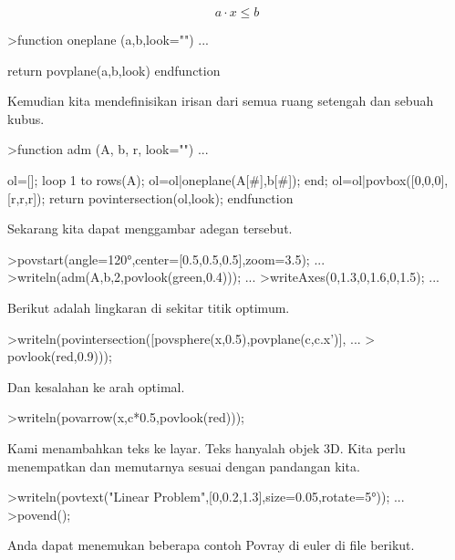 \documentclass{article}
\begin{document}
\begin{eulernotebook}
\begin{eulercomment}
\end{eulercomment}
\begin{eulerformula}
\[
a \cdot x \le b
\]
\end{eulerformula}
\begin{eulerprompt}
>function oneplane (a,b,look="") ...
\end{eulerprompt}
\begin{eulerudf}
    return povplane(a,b,look)
  endfunction
\end{eulerudf}
\begin{eulercomment}
Kemudian kita mendefinisikan irisan dari semua ruang setengah dan
sebuah kubus.
\end{eulercomment}
\begin{eulerprompt}
>function adm (A, b, r, look="") ...
\end{eulerprompt}
\begin{eulerudf}
    ol=[];
    loop 1 to rows(A); ol=ol|oneplane(A[#],b[#]); end;
    ol=ol|povbox([0,0,0],[r,r,r]);
    return povintersection(ol,look);
  endfunction
\end{eulerudf}
\begin{eulercomment}
Sekarang kita dapat menggambar adegan tersebut.
\end{eulercomment}
\begin{eulerprompt}
>povstart(angle=120°,center=[0.5,0.5,0.5],zoom=3.5); ...
>writeln(adm(A,b,2,povlook(green,0.4))); ...
>writeAxes(0,1.3,0,1.6,0,1.5); ...
\end{eulerprompt}
\begin{eulercomment}
Berikut adalah lingkaran di sekitar titik optimum.
\end{eulercomment}
\begin{eulerprompt}
>writeln(povintersection([povsphere(x,0.5),povplane(c,c.x')], ...
>  povlook(red,0.9)));
\end{eulerprompt}
\begin{eulercomment}
Dan kesalahan ke arah optimal.
\end{eulercomment}
\begin{eulerprompt}
>writeln(povarrow(x,c*0.5,povlook(red)));
\end{eulerprompt}
\begin{eulercomment}
Kami menambahkan teks ke layar. Teks hanyalah objek 3D. Kita perlu
menempatkan dan memutarnya sesuai dengan pandangan kita.
\end{eulercomment}
\begin{eulerprompt}
>writeln(povtext("Linear Problem",[0,0.2,1.3],size=0.05,rotate=5°)); ...
>povend();
\end{eulerprompt}
\begin{eulercomment}
Anda dapat menemukan beberapa contoh Povray di euler di file berikut.


\end{eulercomment}
\end{eulernotebook}
\end{document}
